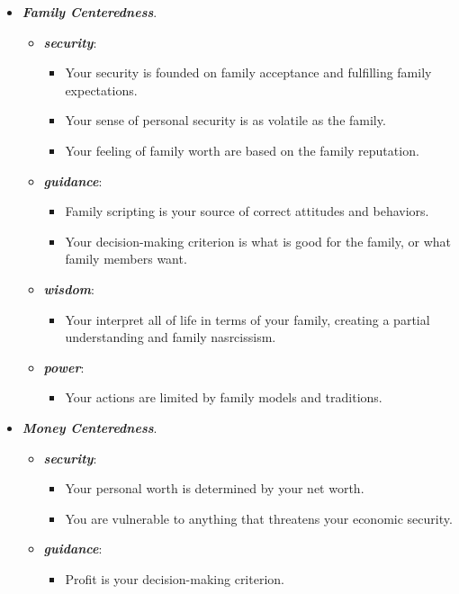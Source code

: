 \documentclass[11pt]{article}
\begin{document}
\begin{itemize}
\begin{itemize}
\item \emph{\textbf{Family Centeredness}}.
\begin{itemize}
\item \emph{\textbf{security}}: 
\begin{itemize}
\item Your security is founded on family acceptance and fulfilling family expectations.
\item Your sense of personal security is as volatile as the family.
\item Your feeling of family worth are based on the family reputation.
\end{itemize}
  
\item \emph{\textbf{guidance}}:
\begin{itemize}
\item Family scripting is your source of correct attitudes and behaviors.
\item Your decision-making criterion is what is good for the family, or what family members want.
\end{itemize}
  
\item \emph{\textbf{wisdom}}:
\begin{itemize}
\item Your interpret all of life in terms of your family, creating a partial understanding and family nasrcissism.
\end{itemize}

\item \emph{\textbf{power}}:
\begin{itemize}
\item Your actions are limited by family models and traditions.
\end{itemize}
\end{itemize}

\item \emph{\textbf{Money Centeredness}}.
\begin{itemize}
\item \emph{\textbf{security}}: 
\begin{itemize}
\item Your personal worth is determined by your net worth.
\item You are vulnerable to anything that threatens your economic security.
\end{itemize}
  
\item \emph{\textbf{guidance}}:
\begin{itemize}
\item Profit is your decision-making criterion.
\end{itemize}
  

\end{itemize}
\end{itemize}
\end{itemize}
\end{document}
